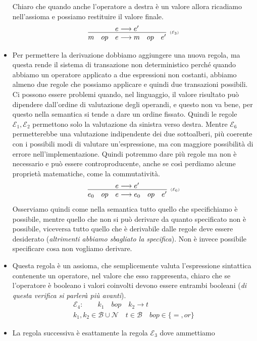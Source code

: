\documentclass[oneside,a4paper,11pt]{book}
\theoremstyle{italicstyle}
\theoremstyle{normStyle}
\begin{document}
\begin{itemize}
Chiaro che quando anche l'operatore a destra è un valore allora 
ricadiamo nell'assioma e possiamo restituire il valore finale.
\[
  \infer[\scriptscriptstyle (\mathcal{E}_3)]
  {
    m \quad op \quad e \longrightarrow m \quad op \quad e'
  }
  {
    e \longrightarrow e'
  }
  \]
  \item Per permettere la derivazione dobbiamo aggiungere una nuova regola, ma questa 
  rende il sistema di transazione non deterministico perché quando abbiamo 
  un operatore applicato a due espressioni non costanti, abbiamo almeno due regole che possiamo 
  applicare e quindi due transazioni possibili.
  Ci possono essere problemi quando, nel linguaggio, il valore 
  risultato può dipendere dall'ordine di valutazione degli operandi, e questo 
  non va bene, per questo nella semantica si tende a dare un ordine fissato.
  Quindi le regole $\mathcal{E}_1, \mathcal{E}_2$ permettono solo la valutazione da sinistra verso destra.
  Mentre $\mathcal{E}_6$ permetterebbe una valutazione indipendente dei due
  sottoalberi, più coerente con i possibili modi di valutare un’espressione,
  ma con maggiore possibilità di errore nell’implementazione.
  Quindi potremmo dare più regole ma non è necessario e può essere
  controproducente, anche se così perdiamo alcune proprietà matematiche,
  come la commutatività.
  \[
    \infer[\scriptscriptstyle (\mathcal{E}_6)]
  {
    e_0 \quad op \quad e \longrightarrow e_0 \quad op \quad e'
  }
  {
    e \longrightarrow e'
  }
  \]
Osserviamo quindi come nella semantica tutto quello che
specifichiamo è possibile, mentre quello che non si può derivare
da quanto specificato non è possibile, viceversa tutto quello che
è derivabile dalle regole deve essere desiderato (\textit{altrimenti abbiamo
sbagliato la specifica}). Non è invece possibile specificare cosa non
vogliamo derivare.
\item Questa regola è un assioma, che semplicemente valuta l'espressione sintattica 
contenente un operatore, nel valore che esso rappresenta, chiaro che se
l’operatore è booleano i valori coinvolti devono essere entrambi
booleani (\textit{di questa verifica si parlerà più avanti}).
\[
  \begin{matrix}
    \mathcal{E}_4: \qquad k_1 \quad bop\quad k_2\rightarrow t \\
    k_1,k_2 \in \mathcal{B}\cup \mathcal{N} \quad t \in \mathcal{B} \quad bop \in \{=,or\}
  \end{matrix}
\]
\item La regola successiva è esattamente la regola $\mathcal{E}_3$ dove ammettiamo

\end{itemize}
\end{document}
